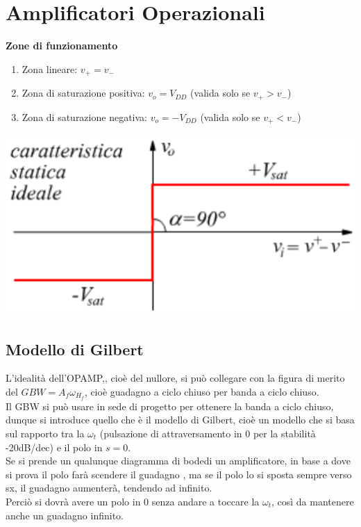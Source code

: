 \documentclass{article}
\begin{document}
\section{Amplificatori Operazionali}
\textbf{Zone di funzionamento}
\begin{enumerate}
    \item Zona lineare: $v_{+}=v_{-}$
    \item Zona di saturazione positiva: $v_{o}=V_{DD}$ (valida solo se $v_{+}>v_{-}$)
    \item Zona di saturazione negativa: $v_{o}=-V_{DD}$ (valida solo se $v_{+}<v_{-}$)
    \end{enumerate}
\begin{center}
    \includegraphics[scale=0.7]{Opamp.png}
\end{center}
\subsection{Modello di Gilbert}
L'idealità dell'OPAMP,, cioè del nullore, si può collegare con la figura di merito del $GBW=A_{f}\omega_{H_{f}}$, cioè guadagno a ciclo chiuso per banda a ciclo chiuso.\\
Il GBW si può usare in sede di progetto per ottenere la banda a ciclo chiuso, dunque si introduce quello che è il modello di Gilbert, cioè un modello che si basa sul rapporto tra la $\omega_{t}$ (pulsazione di attraversamento in 0 per la stabilità -20dB/dec) e il polo in $s=0$.\\
Se si prende un qualunque diagramma di bodedi un amplificatore, in base a dove si prova il polo farà scendere il guadagno , ma se il polo lo si sposta sempre verso sx, il guadagno aumenterà, tendendo ad infinito.\\
Perciò si dovrà avere un polo in 0 senza andare a toccare la $\omega_{t}$, così da mantenere anche un guadagno infinito.
\end{document}
